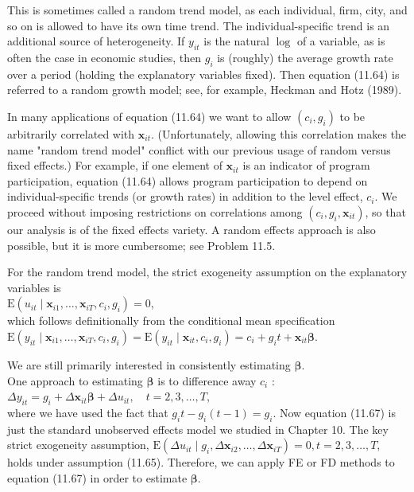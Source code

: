 \documentclass[10pt]{article}
\begin{document}
This is sometimes called a random trend model, as each individual, firm, city, and so on is allowed to have its own time trend. The individual-specific trend is an additional source of heterogeneity. If $y_{i t}$ is the natural $\log$ of a variable, as is often the case in economic studies, then $g_{i}$ is (roughly) the average growth rate over a period (holding the explanatory variables fixed). Then equation (11.64) is referred to a random growth model; see, for example, Heckman and Hotz (1989).

In many applications of equation (11.64) we want to allow $\left(c_{i}, g_{i}\right)$ to be arbitrarily correlated with $\mathbf{x}_{i t}$. (Unfortunately, allowing this correlation makes the name "random trend model" conflict with our previous usage of random versus fixed effects.) For example, if one element of $\mathbf{x}_{i t}$ is an indicator of program participation, equation (11.64) allows program participation to depend on individual-specific trends (or growth rates) in addition to the level effect, $c_{i}$. We proceed without imposing restrictions on correlations among $\left(c_{i}, g_{i}, \mathbf{x}_{i t}\right)$, so that our analysis is of the fixed effects variety. A random effects approach is also possible, but it is more cumbersome; see Problem 11.5.

For the random trend model, the strict exogeneity assumption on the explanatory variables is\\
$\mathrm{E}\left(u_{i t} \mid \mathbf{x}_{i 1}, \ldots, \mathbf{x}_{i T}, c_{i}, g_{i}\right)=0$,\\
which follows definitionally from the conditional mean specification\\
$\mathrm{E}\left(y_{i t} \mid \mathbf{x}_{i 1}, \ldots, \mathbf{x}_{i T}, c_{i}, g_{i}\right)=\mathrm{E}\left(y_{i t} \mid \mathbf{x}_{i t}, c_{i}, g_{i}\right)=c_{i}+g_{i} t+\mathbf{x}_{i t} \boldsymbol{\beta}$.

We are still primarily interested in consistently estimating $\boldsymbol{\beta}$.\\
One approach to estimating $\boldsymbol{\beta}$ is to difference away $c_{i}$ :\\
$\Delta y_{i t}=g_{i}+\Delta \mathbf{x}_{i t} \boldsymbol{\beta}+\Delta u_{i t}, \quad t=2,3, \ldots, T$,\\
where we have used the fact that $g_{i} t-g_{i}(t-1)=g_{i}$. Now equation (11.67) is just the standard unobserved effects model we studied in Chapter 10. The key strict exogeneity assumption, $\mathrm{E}\left(\Delta u_{i t} \mid g_{i}, \Delta \mathbf{x}_{i 2}, \ldots, \Delta \mathbf{x}_{i T}\right)=0, t=2,3, \ldots, T$, holds under assumption (11.65). Therefore, we can apply FE or FD methods to equation (11.67) in order to estimate $\boldsymbol{\beta}$.
\end{document}
